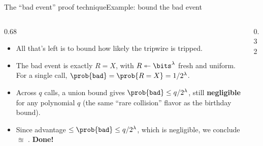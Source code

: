 \ifdefined\PRESENTATION\else\PassOptionsToClass{handout}{beamer}\fi\documentclass[aspectratio=169, lualatex]{beamer}
\begin{document}
\begin{frame}{The ``bad event'' proof technique}{Example: bound the bad event}
	\begin{columns}[c]
		\begin{column}{0.68\textwidth}
			\begin{itemize}[<+->]
				\item All that's left is to bound how likely the tripwire is tripped.
				\item The bad event is exactly $R = X$, with $R \twoheadleftarrow \bits^\lambda$ fresh and uniform. For a single call, $\prob{\texttt{bad}} = \prob{R = X} = 1/2^\lambda$.
				\item Across $q$ calls, a union bound gives $\prob{\texttt{bad}} \leq q/2^\lambda$, still \textbf{negligible} for any polynomial $q$ (the same ``rare collision'' flavor as the birthday bound).
				\item Since advantage $\leq \prob{\texttt{bad}} \leq q/2^\lambda$, which is negligible, we conclude  $\approxeq$ . \textbf{Done!}
			\end{itemize}
		\end{column}
		\begin{column}{0.32\textwidth}
			\begin{center}
			\end{center}
		\end{column}
	\end{columns}
\end{frame}
\end{document}
